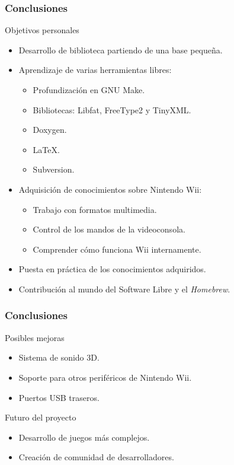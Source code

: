 \begin{frame}	
\frametitle{Conclusiones}
	\begin{block}{Objetivos personales}
		\begin{itemize}
			\item Desarrollo de biblioteca partiendo de una base pequeña.
			\item Aprendizaje de varias herramientas libres:
			\begin{itemize}
				\item Profundización en GNU Make.
				\item Bibliotecas: Libfat, FreeType2 y TinyXML.
				\item Doxygen.
				\item \LaTeX.
				\item Subversion.
			\end{itemize}
			\item Adquisición de conocimientos sobre Nintendo Wii:
			\begin{itemize}
				\item Trabajo con formatos multimedia.
				\item Control de los mandos de la videoconsola.
				\item Comprender cómo funciona Wii internamente.
			\end{itemize}
			\item Puesta en práctica de los conocimientos adquiridos.
			\item Contribución al mundo del Software Libre y el \textit{Homebrew}.
		\end{itemize}
	\end{block}
\end{frame}

\begin{frame}	
\frametitle{Conclusiones}
	\begin{block}{Posibles mejoras}
		\begin{itemize}
			\item Sistema de sonido 3D.
			\item Soporte para otros periféricos de Nintendo Wii.
			\item Puertos USB traseros.
		\end{itemize}
	\end{block}
	\begin{block}{Futuro del proyecto}
		\begin{itemize}
			\item Desarrollo de juegos más complejos.
			\item Creación de comunidad de desarrolladores.
		\end{itemize}
	\end{block}
\end{frame}

